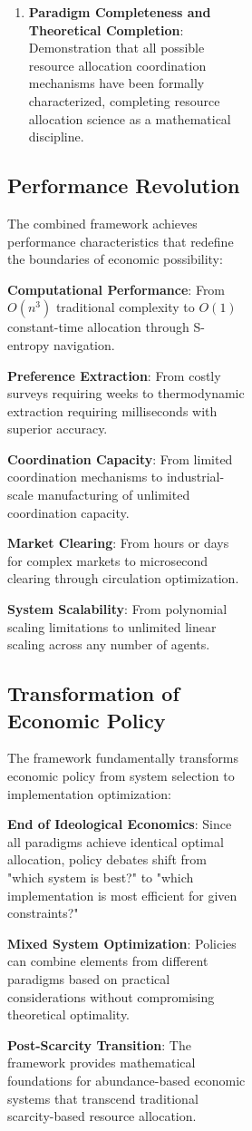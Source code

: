\documentclass[12pt,a4paper]{article}
\begin{document}
\begin{figure}[H]
\begin{figure}[H]
\begin{figure}[H]
\begin{enumerate}
\item \textbf{Paradigm Completeness and Theoretical Completion}: Demonstration that all possible resource allocation coordination mechanisms have been formally characterized, completing resource allocation science as a mathematical discipline.
\end{enumerate}

\subsection{Performance Revolution}

The combined framework achieves performance characteristics that redefine the boundaries of economic possibility:

\textbf{Computational Performance}: From $O(n^3)$ traditional complexity to $O(1)$ constant-time allocation through S-entropy navigation.

\textbf{Preference Extraction}: From costly surveys requiring weeks to thermodynamic extraction requiring milliseconds with superior accuracy.

\textbf{Coordination Capacity}: From limited coordination mechanisms to industrial-scale manufacturing of unlimited coordination capacity.

\textbf{Market Clearing}: From hours or days for complex markets to microsecond clearing through circulation optimization.

\textbf{System Scalability}: From polynomial scaling limitations to unlimited linear scaling across any number of agents.

\subsection{Transformation of Economic Policy}

The framework fundamentally transforms economic policy from system selection to implementation optimization:

\textbf{End of Ideological Economics}: Since all paradigms achieve identical optimal allocation, policy debates shift from "which system is best?" to "which implementation is most efficient for given constraints?"

\textbf{Mixed System Optimization}: Policies can combine elements from different paradigms based on practical considerations without compromising theoretical optimality.

\textbf{Post-Scarcity Transition}: The framework provides mathematical foundations for abundance-based economic systems that transcend traditional scarcity-based resource allocation.


\end{figure}
\end{figure}
\end{figure}
\end{document}
